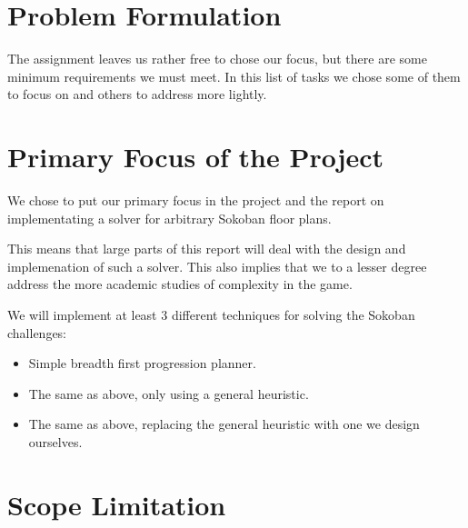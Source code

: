 \section{Problem Formulation}

The assignment leaves us rather free to chose our focus, but there are
some minimum requirements we must meet. In this list of tasks we chose
some of them to focus on and others to address more lightly.

\section{Primary Focus of the Project}
We chose to put our primary focus in the project and the report on
implementating a solver for arbitrary Sokoban floor plans.

This means that large parts of this report will deal with the design
and implemenation of such a solver. This also implies that we to a
lesser degree address the more academic studies of complexity in the
game.

We will implement at least 3 different techniques for solving the
Sokoban challenges:
\begin{itemize}
\item Simple breadth first progression planner. %
\item The same as above, only using a general heuristic. 
\item The same as above, replacing the general heuristic with one we design ourselves.
\end{itemize}

\section{Scope Limitation}




